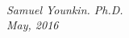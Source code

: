 \begin{titlepage}
\vspace*{1.5in}
\begin{center}
\\
\vspace*{0.5in}
\LARGE{\slshape Samuel Younkin. Ph.D.}\\
\vspace*{0.5in}
\Large{\itshape May, 2016}




\end{center}

\end{titlepage}
